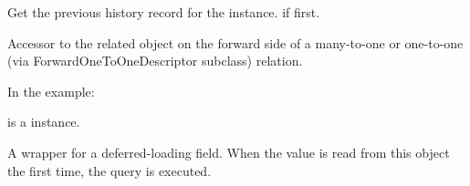\documentclass[letterpaper,10pt,english]{sphinxmanual}
\begin{document}
\begin{fulllineitems}

\begin{fulllineitems}
\label{\detokenize{modules/models:gestion.models.HistoricalConsumption.prev_record}}
Get the previous history record for the instance.  if first.

\end{fulllineitems}


\begin{fulllineitems}
\label{\detokenize{modules/models:gestion.models.HistoricalConsumption.product}}
Accessor to the related object on the forward side of a many-to-one or
one-to-one (via ForwardOneToOneDescriptor subclass) relation.

In the example:

\begin{sphinxVerbatim}[commandchars=\\\{\}]
 
       
\end{sphinxVerbatim}

 is a  instance.

\end{fulllineitems}


\begin{fulllineitems}
\label{\detokenize{modules/models:gestion.models.HistoricalConsumption.product_id}}
A wrapper for a deferred-loading field. When the value is read from this
object the first time, the query is executed.

\end{fulllineitems}


\end{fulllineitems}
\end{document}
